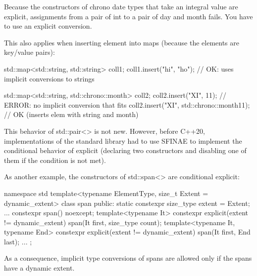 Because the constructors of chrono date types that take an integral value are explicit, assignments from a pair of int to a pair of day and month fails. You have to use an explicit conversion.

This also applies when inserting element into maps (because the elements are key/value pairs):

\begin{cpp}
std::map<std::string, std::string> coll1;
coll1.insert({"hi", "ho"}); // OK: uses implicit conversions to strings

std::map<std::string, std::chrono::month> coll2;
coll2.insert({"XI", 11}); // ERROR: no implicit conversion that fits
coll2.insert({"XI", std::chrono::month{11}}); // OK (inserts elem with string and month)
\end{cpp}

This behavior of std::pair<> is not new. However, before C++20, implementations of the standard library had to use SFINAE to implement the conditional behavior of explicit (declaring two constructors and disabling one of them if the condition is not met).

As another example, the constructors of std::span<> are conditional explicit:

\begin{cpp}
namespace std {
	template<typename ElementType, size_t Extent = dynamic_extent>
	class span {
	public:
		static constexpr size_type extent = Extent;
		...
		constexpr span() noexcept;
		template<typename It>
			constexpr explicit(extent != dynamic_extent)
			span(It first, size_type count);
		template<typename It, typename End>
			constexpr explicit(extent != dynamic_extent)
			span(It first, End last);
		...
	};
}
\end{cpp}

As a consequence, implicit type conversions of spans are allowed only if the spans have a dynamic extent.











